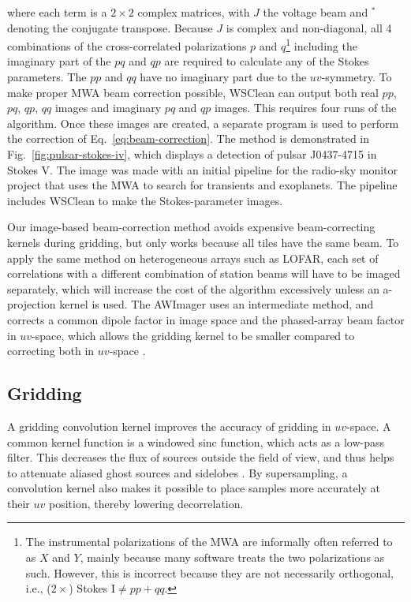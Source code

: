 \documentclass[useAMS,usenatbib]{mn2e}
\begin{document}
where each term is a $2\times2$ complex matrices, with $J$ the voltage beam and $^*$ denoting the conjugate transpose. Because $J$ is complex and non-diagonal, all 4 combinations of the cross-correlated polarizations $p$ and $q$\footnote{The instrumental polarizations of the MWA are informally often referred to as $X$ and $Y$, mainly because many software treats the two polarizations as such. However, this is incorrect because they are not necessarily orthogonal, i.e., ($2\times$) Stokes I$\neq pp + qq$.} including the imaginary part of the $pq$ and $qp$ are required to calculate any of the Stokes parameters. The $pp$ and $qq$ have no imaginary part due to the $uv$-symmetry. To make proper MWA beam correction possible, WSClean can output both real $pp$, $pq$, $qp$, $qq$ images and imaginary $pq$ and $qp$ images. This requires four runs of the algorithm. Once these images are created, a separate program is used to perform the correction of Eq.~\eqref{eq:beam-correction}. The method is demonstrated in Fig.~\ref{fig:pulsar-stokes-iv}, which displays a detection of pulsar J0437-4715 in Stokes V. The image was made with an initial pipeline for the radio-sky monitor project that uses the MWA to search for transients and exoplanets. The pipeline includes WSClean to make the Stokes-parameter images.

Our image-based beam-correction method avoids expensive beam-correcting kernels during gridding, but only works because all tiles have the same beam. To apply the same method on heterogeneous arrays such as LOFAR, each set of correlations with a different combination of station beams will have to be imaged separately, which will increase the cost of the algorithm excessively unless an a-projection kernel is used. The AWImager uses an intermediate method, and corrects a common dipole factor in image space and the phased-array beam factor in $uv$-space, which allows the gridding kernel to be smaller compared to correcting both in $uv$-space \citep{awimager-2013}.

\subsection{Gridding} \label{sec:gridding}
A gridding convolution kernel improves the accuracy of gridding in $uv$-space. A common kernel function is a windowed sinc function, which acts as a low-pass filter. This decreases the flux of sources outside the field of view, and thus helps to attenuate aliased ghost sources and sidelobes \citep{post-correlation-filtering}. By supersampling, a convolution kernel also makes it possible to place samples more accurately at their $uv$ position, thereby lowering decorrelation.
\end{document}
